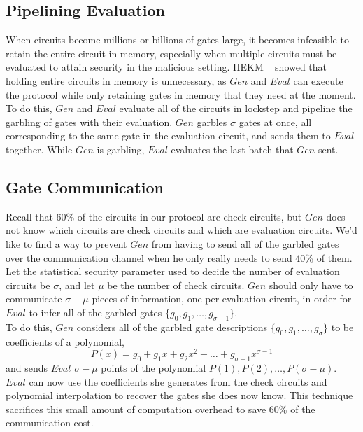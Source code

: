 \documentclass{article}
\begin{document}
\subsection{Pipelining Evaluation} \label{sec:pipeline-eval}
When circuits become millions or billions of gates large, it becomes infeasible to retain the entire circuit in memory, especially when multiple circuits must be evaluated to attain security in the malicious setting. HEKM ~\cite{HEKM} showed that holding entire circuits in memory is unnecessary, as $Gen$ and $Eval$ can execute the protocol while only retaining gates in memory that they need at the moment. To do this, $Gen$ and $Eval$ evaluate all of the circuits in lockstep and pipeline the garbling of gates with their evaluation. $Gen$ garbles $\sigma$ gates at once, all corresponding to the same gate in the evaluation circuit, and sends them to $Eval$ together. While $Gen$ is garbling, $Eval$ evaluates the last batch that $Gen$ sent. 


\subsection{Gate Communication} \label{sec:gate-comm-opt}

Recall that 60\% of the circuits in our protocol are check circuits, but $Gen$ does not know which circuits are check circuits and which are evaluation circuits. We'd like to find a way to prevent $Gen$ from having to send all of the garbled gates over the communication channel when he only really needs to send 40\% of them. Let the statistical security parameter used to decide the number of evaluation circuits be $\sigma$, and let $\mu$ be the number of check circuits. $Gen$ should only have to communicate $\sigma - \mu$ pieces of information, one per evaluation circuit, in order for $Eval$ to infer all of the garbled gates $\{g_{0}, g_{1}, \dots, g_{\sigma -1} \}$.\\

To do this, $Gen$ considers all of the garbled gate descriptions $\{g_{0}, g_{1}, \dots, g_{\sigma} \}$ to be coefficients of a polynomial, $$P(x) = g_{0} + g_{1}x + g_{2}x^{2} + \dots + g_{\sigma-1}x^{\sigma-1}$$ and sends $Eval$ $\sigma - \mu$ points of the polynomial $P(1), P(2), \dots , P(\sigma - \mu)$.  $Eval$ can now use the coefficients she generates from the check circuits and polynomial interpolation to recover the gates she does now know. This technique sacrifices this small amount of computation overhead to save 60\% of the communication cost.
\end{document}
